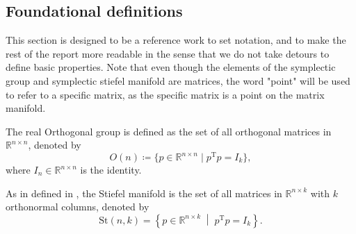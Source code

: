 \subsection{Foundational definitions}
This section is designed to be a reference work to set notation, and to make the rest of the report more readable in the sense that we do not take detours to define basic properties. Note that even though the elements of the symplectic group and symplectic stiefel manifold are matrices, the word "point" will be used to refer to a specific matrix, as the specific matrix is a point on the matrix manifold.



\begin{definition}\label{def:orthogonal_group}
    The \textup{real Orthogonal group} is defined as the set of all orthogonal matrices in $\mathbb{R}^{n\times n}$, denoted by 
    \begin{equation*}
        O(n)\coloneqq \{p\in\mathbb{R}^{n\times n} \;|\; p^{\mathrm{T}}p=I_{k}\},
    \end{equation*}
    where $I_{n}\in\mathbb{R}^{n\times n}$ is the identity. \cite[p.~10]{Boumal2023}
    
\end{definition}

\begin{definition}\label{def:stiefel_manifold}
    As in defined in \cite[p.~9]{Boumal2023}, the \textup{Stiefel manifold} is the set of all matrices in $\mathbb{R}^{n\times k}$ with $k$ orthonormal columns, denoted by
    \begin{equation*}
    \mathrm{St}(n,k)=\left\{ p \in \mathbb{R}^{n\times k}\;\middle|\;p^{\mathrm{T}}p=I_{k} \right\}.
    \end{equation*}
\end{definition}

